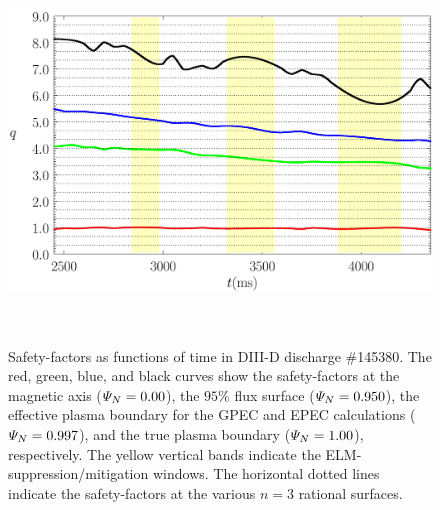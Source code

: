 \documentclass[12pt,prb,aps]{revtex4-1}
\begin{document}
\begin{figure}
\includegraphics[height=4in]{fig4.pdf}
\caption{Safety-factors as functions of time in  DIII-D discharge \#145380. The red, green, blue, and black curves show the safety-factors
at the magnetic axis (${\mit\Psi}_N=0.00$),
the $95\%$ flux surface (${\mit\Psi}_N=0.950$), the
effective plasma boundary for the GPEC and EPEC calculations
(${\mit\Psi}_N=0.997$), and the true plasma boundary (${\mit\Psi}_N=1.00$), respectively. The yellow vertical bands indicate the ELM-suppression/mitigation windows. 
The horizontal dotted lines indicate the safety-factors at the various $n=3$ rational surfaces.} \label{fig4}
\end{figure}
\end{document}
